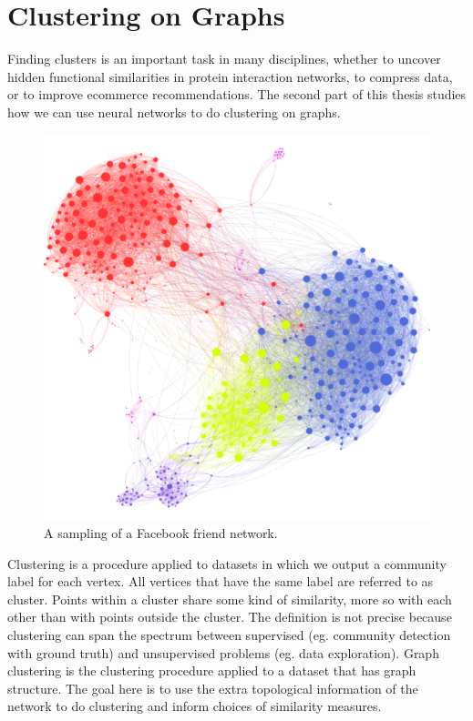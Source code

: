 \chapter{Clustering on Graphs}

Finding clusters is an important task in many disciplines, whether to uncover hidden functional similarities in protein interaction networks, to compress data, or to improve ecommerce recommendations. The second part of this thesis studies how we can use neural networks to do clustering on graphs.  

\begin{figure}[H]
\begin{center}
  \includegraphics[scale=0.13]{social_network.png}
  \caption{A sampling of a Facebook friend network.\cite{social_network}}
  \label{fig:socialnet}
 \end{center}
\end{figure}

Clustering is a procedure applied to datasets in which we output a community label for each vertex.  All vertices that have the same label are referred to as cluster. Points within a cluster share some kind of similarity, more so with each other than with points outside the cluster. The definition is not precise because clustering can span the spectrum between supervised (eg. community detection with ground truth) and unsupervised problems (eg. data exploration). Graph clustering is the clustering procedure applied to a dataset that has graph structure. The goal here is to use the extra topological information of the network to do clustering and inform choices of similarity measures.


